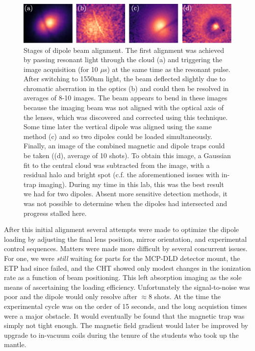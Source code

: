 	\begin{figure}
	\centering
	\includegraphics[width=\textwidth]{fig/lattice/dipole_alignment_stages}
		\caption{Stages of dipole beam alignment.
	The first alignment was achieved by passing resonant light through the cloud (a) and triggering the image acquisition (for 10 $\mu$s) at the same time as the resonant pulse.
	After switching to 1550nm light, the beam deflected slightly due to chromatic aberration in the optics (b) and could then be resolved in averages of 8-10 images. 
	The beam appears to bend in these images because the imaging beam was not aligned with the optical axis of the lenses, which was discovered and corrected using this technique.
	Some time later the vertical dipole was aligned using the same method (c) and so two dipoles could be loaded simultaneously. 
	Finally, an image of the combined magnetic and dipole traps could be taken ((d), average of 10 shots). To obtain this image, a Gaussian fit to the central cloud was subtracted from the image, with a residual halo and bright spot (c.f. the aforementioned issues with in-trap imaging).
	During my time in this lab, this was the best result we had for two dipoles.
	Absent more sensitive detection methods, it was not possible to determine when the dipoles had intersected and progress stalled here.}
	\label{fig:dipole_align}
	\end{figure}

	After this initial alignment several attempts were made to optimize the dipole loading by adjusting the final lens position, mirror orientation, and experimental control sequences.	
	Matters were made more difficult by several concurrent issues.
	For one, we were \emph{still} waiting for parts for the MCP-DLD detector mount, the ETP had since failed, and the CHT showed only modest changes in the ionization rate as a function of beam positioning.	
	This left absorption imaging as the sole means of ascertaining the loading efficiency.
	Unfortunately the signal-to-noise was poor and the dipole would only resolve after $\approx 8$ shots.
	At the time the experimental cycle was on the order of 15 seconds, and the long acquistion times were a major obstacle.
	It would eventually be found that the magnetic trap was simply not tight enough.
	The magnetic field gradient would later be improved by upgrade to in-vacuum coils during the tenure of the students who took up the mantle.
	

